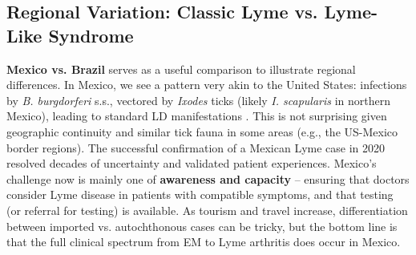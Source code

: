 \documentclass[11pt,letterpaper]{article}
\begin{document}
\subsection{Regional Variation: Classic Lyme vs. Lyme-Like Syndrome}
\textbf{Mexico vs. Brazil} serves as a useful comparison to illustrate regional differences. In Mexico, we see a pattern very akin to the United States: infections by \textit{B. burgdorferi} s.s., vectored by \textit{Ixodes} ticks (likely \textit{I. scapularis} in northern Mexico), leading to standard LD manifestations \citep{Colunga-Salas2020p}. This is not surprising given geographic continuity and similar tick fauna in some areas (e.g., the US-Mexico border regions). The successful confirmation of a Mexican Lyme case in 2020 resolved decades of uncertainty and validated patient experiences. Mexico’s challenge now is mainly one of \textbf{awareness and capacity} – ensuring that doctors consider Lyme disease in patients with compatible symptoms, and that testing (or referral for testing) is available. As tourism and travel increase, differentiation between imported vs. autochthonous cases can be tricky, but the bottom line is that the full clinical spectrum from EM to Lyme arthritis does occur in Mexico.
\end{document}
